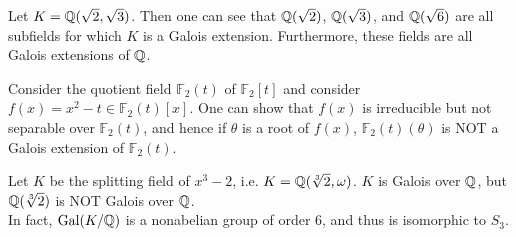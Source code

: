 \documentclass{memoir}
\begin{document}


\begin{exmp}
	Let \(K = \mathbb{Q}(\sqrt{2} ,\sqrt{3} )\). Then one can see that \(\mathbb{Q}(\sqrt{2} )\), \(\mathbb{Q}(\sqrt{3} )\), and \(\mathbb{Q}(\sqrt{6} )\) are all subfields for which \(K\) is a Galois extension. Furthermore, these fields are all Galois extensions of \(\mathbb{Q}\).
\end{exmp}

\begin{exmp}
	Consider the quotient field \(\mathbb{F}_2(t)\) of \(\mathbb{F}_2[t]\) and consider \(f(x) = x^2-t \in \mathbb{F}_2(t)[x]\). One can show that \(f(x)\) is irreducible but not separable over \(\mathbb{F}_2(t)\), and hence if \(\theta \) is a root of \(f(x)\), \(\mathbb{F}_2(t)(\theta )\) is NOT a Galois extension of \(\mathbb{F}_2(t)\).
\end{exmp}

\begin{exmp}
	Let \(K\) be the splitting field of \(x^3-2\), i.e. \(K = \mathbb{Q}(\sqrt[3]{2} ,\omega )\). \(K\) is Galois over \(\mathbb{Q}\), but \(\mathbb{Q}(\sqrt[3]{2} )\) is NOT Galois over \(\mathbb{Q}\).\\

	In fact, \(\textrm{Gal}(K / \mathbb{Q}) \) is a nonabelian group of order 6, and thus is isomorphic to \(S_3\).
\end{exmp}
\end{document}
